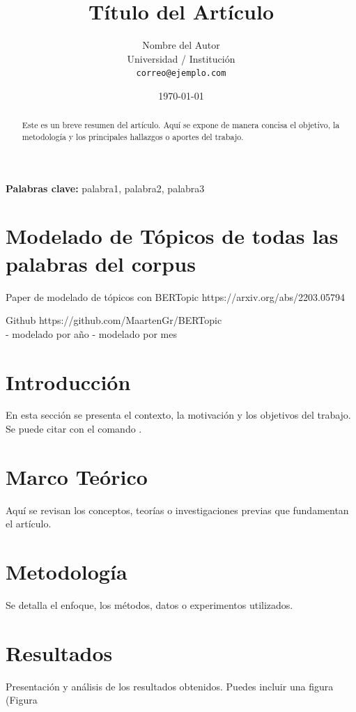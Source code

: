 \documentclass[12pt,a4paper]{article}
\title{Título del Artículo}
\author{Nombre del Autor \\[0.5em]
	\small Universidad / Institución \\
	\small \texttt{correo@ejemplo.com}}
\date{\today}
\begin{document}
	
	\maketitle
	
	\begin{abstract}
		Este es un breve resumen del artículo. Aquí se expone de manera concisa el objetivo, la metodología y los principales hallazgos o aportes del trabajo.
	\end{abstract}
	
	\textbf{Palabras clave:} palabra1, palabra2, palabra3
	
	\section{Modelado de Tópicos de todas las palabras del corpus}
	Paper de modelado de tópicos con BERTopic https://arxiv.org/abs/2203.05794
	
	Github
	https://github.com/MaartenGr/BERTopic\\
	
	
	- modelado por año
	- modelado por mes
	
	
	\section{Introducción}
	En esta sección se presenta el contexto, la motivación y los objetivos del trabajo.  
	Se puede citar con el comando \cite{autor2020}.
	
	\section{Marco Teórico}
	Aquí se revisan los conceptos, teorías o investigaciones previas que fundamentan el artículo.
	
	\section{Metodología}
	Se detalla el enfoque, los métodos, datos o experimentos utilizados.
	
	\section{Resultados}
	Presentación y análisis de los resultados obtenidos.  
	Puedes incluir una figura (Figura %
	
	
	
	
	
\end{document}

